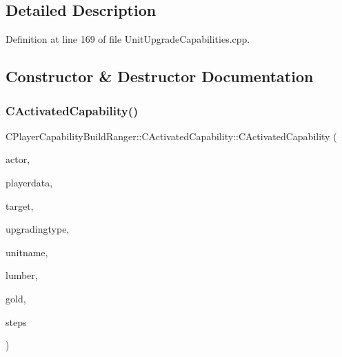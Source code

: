 \subsection{Detailed Description}


Definition at line 169 of file Unit\+Upgrade\+Capabilities.\+cpp.



\subsection{Constructor \& Destructor Documentation}
\hypertarget{classCPlayerCapabilityBuildRanger_1_1CActivatedCapability_a8b462671b0888c5374f4196b04d411d6}{}\label{classCPlayerCapabilityBuildRanger_1_1CActivatedCapability_a8b462671b0888c5374f4196b04d411d6} 
\subsubsection{\texorpdfstring{C\+Activated\+Capability()}{CActivatedCapability()}}
{\footnotesize\ttfamily C\+Player\+Capability\+Build\+Ranger\+::\+C\+Activated\+Capability\+::\+C\+Activated\+Capability (\begin{DoxyParamCaption}\item[{std\+::shared\+\_\+ptr$<$ \hyperlink{classCPlayerAsset}{C\+Player\+Asset} $>$}]{actor,  }\item[{std\+::shared\+\_\+ptr$<$ \hyperlink{classCPlayerData}{C\+Player\+Data} $>$}]{playerdata,  }\item[{std\+::shared\+\_\+ptr$<$ \hyperlink{classCPlayerAsset}{C\+Player\+Asset} $>$}]{target,  }\item[{std\+::shared\+\_\+ptr$<$ \hyperlink{classCPlayerAssetType}{C\+Player\+Asset\+Type} $>$}]{upgradingtype,  }\item[{const std\+::string \&}]{unitname,  }\item[{int}]{lumber,  }\item[{int}]{gold,  }\item[{int}]{steps }\end{DoxyParamCaption})}



